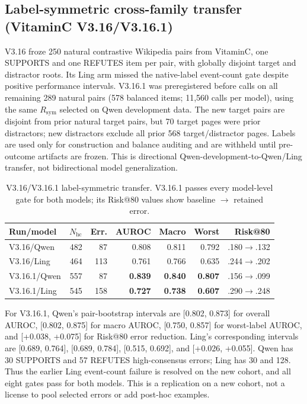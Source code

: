 \documentclass[11pt]{article}
\begin{document}
\subsection{Label-symmetric cross-family transfer (VitaminC V3.16/V3.16.1)}

V3.16 froze 250 natural contrastive Wikipedia pairs from VitaminC, one SUPPORTS and one REFUTES item per pair, with globally disjoint target and distractor roots. Its Ling arm missed the native-label event-count gate despite positive performance intervals. V3.16.1 was preregistered before calls on all remaining 289 natural pairs (578 balanced items; 11,560 calls per model), using the same $R_{\mathrm{sym}}$ selected on Qwen development data. The new target pairs are disjoint from prior natural target pairs, but 70 target pages were prior distractors; new distractors exclude all prior 568 target/distractor pages. Labels are used only for construction and balance auditing and are withheld until pre-outcome artifacts are frozen. This is directional Qwen-development-to-Qwen/Ling transfer, not bidirectional model generalization.

\begin{table}[t]
\centering
\scriptsize
\setlength{\tabcolsep}{1.5pt}
\begin{tabular}{lrrrrrr}
\toprule
Run/model & $N_{\mathrm{hc}}$ & Err. & AUROC & Macro & Worst & Risk@80 \\
\midrule
V3.16/Qwen & 482 & 87 & 0.808 & 0.811 & 0.792 & .180$\to$.132 \\
V3.16/Ling & 464 & 113 & 0.761 & 0.766 & 0.635 & .244$\to$.202 \\
V3.16.1/Qwen & 557 & 87 & \textbf{0.839} & \textbf{0.840} & \textbf{0.807} & .156$\to$.099 \\
V3.16.1/Ling & 545 & 158 & \textbf{0.727} & \textbf{0.738} & \textbf{0.607} & .290$\to$.248 \\
\bottomrule
\end{tabular}
\caption{V3.16/V3.16.1 label-symmetric transfer. V3.16.1 passes every model-level gate for both models; its Risk@80 values show baseline $\to$ retained error.}
\label{tab:v316}
\end{table}

For V3.16.1, Qwen's pair-bootstrap intervals are [0.802, 0.873] for overall AUROC, [0.802, 0.875] for macro AUROC, [0.750, 0.857] for worst-label AUROC, and [+0.038, +0.075] for Risk@80 error reduction. Ling's corresponding intervals are [0.689, 0.764], [0.689, 0.784], [0.515, 0.692], and [+0.026, +0.055]. Qwen has 30 SUPPORTS and 57 REFUTES high-consensus errors; Ling has 30 and 128. Thus the earlier Ling event-count failure is resolved on the new cohort, and all eight gates pass for both models. This is a replication on a new cohort, not a license to pool selected errors or add post-hoc examples.
\end{document}
